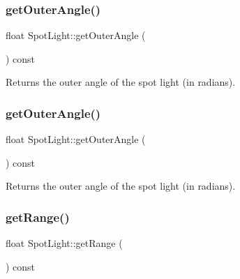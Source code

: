 \mbox{\label{classSpotLight_a2273fc15dd613144c4b89556d3f7a0f7}} 
\subsubsection{\texorpdfstring{get\+Outer\+Angle()}{getOuterAngle()}\hspace{0.1cm}{\footnotesize\ttfamily [1/2]}}
{\footnotesize\ttfamily float Spot\+Light\+::get\+Outer\+Angle (\begin{DoxyParamCaption}{ }\end{DoxyParamCaption}) const\hspace{0.3cm}{\ttfamily [inline]}}

Returns the outer angle of the spot light (in radians). \mbox{\label{classSpotLight_a2273fc15dd613144c4b89556d3f7a0f7}} 
\subsubsection{\texorpdfstring{get\+Outer\+Angle()}{getOuterAngle()}\hspace{0.1cm}{\footnotesize\ttfamily [2/2]}}
{\footnotesize\ttfamily float Spot\+Light\+::get\+Outer\+Angle (\begin{DoxyParamCaption}{ }\end{DoxyParamCaption}) const\hspace{0.3cm}{\ttfamily [inline]}}

Returns the outer angle of the spot light (in radians). \mbox{\label{classSpotLight_a5309f78c0a001e377947df39b257d31e}} 
\subsubsection{\texorpdfstring{get\+Range()}{getRange()}\hspace{0.1cm}{\footnotesize\ttfamily [1/2]}}
{\footnotesize\ttfamily float Spot\+Light\+::get\+Range (\begin{DoxyParamCaption}{ }\end{DoxyParamCaption}) const\hspace{0.3cm}{\ttfamily [inline]}}

